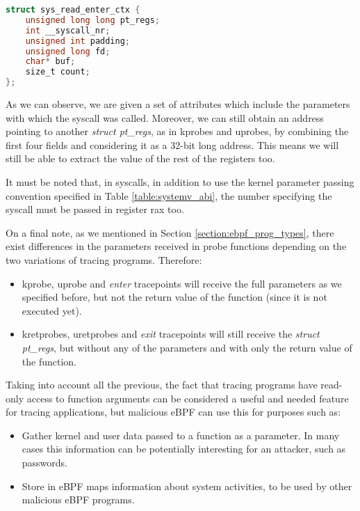 \begin{lstlisting}[language=C, caption={Format of custom struct sys\_read\_enter\_ctx.}, label={code:sys_enter_read_tp}]
struct sys_read_enter_ctx {
    unsigned long long pt_regs;
    int __syscall_nr;
    unsigned int padding;
    unsigned long fd;
    char* buf;
    size_t count;
};
\end{lstlisting}

As we can observe, we are given a set of attributes which include the parameters with which the syscall was called. Moreover, we can still obtain an address pointing to another \textit{struct pt\_regs}, as in kprobes and uprobes, by combining the first four fields and considering it as a 32-bit long address. This means we will still be able to extract the value of the rest of the registers too. 

It must be noted that, in syscalls, in addition to use the kernel parameter passing convention specified in Table \ref{table:systemv_abi}, the number specifying the syscall must be passed in register rax too.

On a final note, as we mentioned in Section \ref{section:ebpf_prog_types}, there exist differences in the parameters received in probe functions depending on the two variations of tracing programs. Therefore:
\begin{itemize}
\item kprobe, uprobe and \textit{enter} tracepoints will receive the full parameters as we specified before, but not the return value of the function (since it is not executed yet).
\item kretprobes, uretprobes and \textit{exit} tracepoints will still receive the \textit{struct pt\_regs}, but without any of the parameters and with only the return value of the function.
\end{itemize}

Taking into account all the previous, the fact that tracing programs have read-only access to function arguments can be considered a useful and needed feature for tracing applications, but malicious eBPF can use this for purposes such as:
\begin{itemize}
\item Gather kernel and user data passed to a function as a parameter. In many cases this information can be potentially interesting for an attacker, such as passwords.
\item Store in eBPF maps information about system activities, to be used by other malicious eBPF programs.
\end{itemize}

